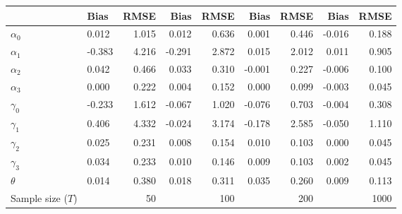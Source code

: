 
\begin{tabular}[t]{llrrrrrrr}
\toprule
  & Bias & RMSE & Bias & RMSE & Bias & RMSE & Bias & RMSE\\
\midrule
$\alpha_{0}$ & 0.012 & 1.015 & 0.012 & 0.636 & 0.001 & 0.446 & -0.016 & 0.188\\
$\alpha_{1}$ & -0.383 & 4.216 & -0.291 & 2.872 & 0.015 & 2.012 & 0.011 & 0.905\\
$\alpha_{2}$ & 0.042 & 0.466 & 0.033 & 0.310 & -0.001 & 0.227 & -0.006 & 0.100\\
$\alpha_{3}$ & 0.000 & 0.222 & 0.004 & 0.152 & 0.000 & 0.099 & -0.003 & 0.045\\
$\gamma_{0}$ & -0.233 & 1.612 & -0.067 & 1.020 & -0.076 & 0.703 & -0.004 & 0.308\\
$\gamma_{1}$ & 0.406 & 4.332 & -0.024 & 3.174 & -0.178 & 2.585 & -0.050 & 1.110\\
$\gamma_{2}$ & 0.025 & 0.231 & 0.008 & 0.154 & 0.010 & 0.103 & 0.000 & 0.045\\
$\gamma_{3}$ & 0.034 & 0.233 & 0.010 & 0.146 & 0.009 & 0.103 & 0.002 & 0.045\\
$\theta$ & 0.014 & 0.380 & 0.018 & 0.311 & 0.035 & 0.260 & 0.009 & 0.113\\
Sample size ($T$) &  & 50 &  & 100 &  & 200 &  & 1000\\
\bottomrule
\end{tabular}
